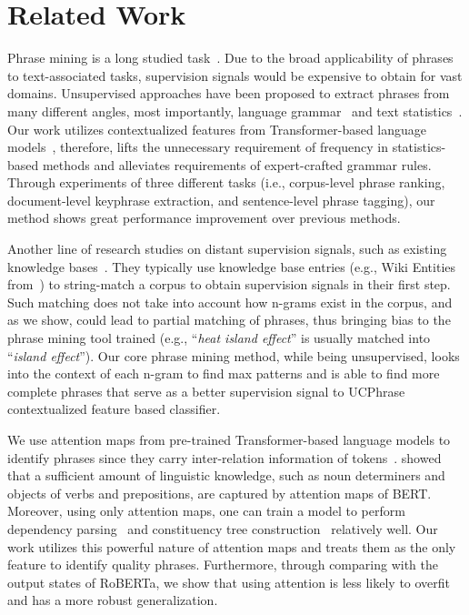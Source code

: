 \documentclass[sigconf]{acmart}
\newcommand{\our}{\mbox{UCPhrase}\xspace}
\newcommand{\eg}{\mbox{e.g.}\xspace}
\newcommand{\example}[1]{``\emph{#1}''}
\begin{document}
  \section{Related Work}
Phrase mining is a long studied task~\cite{frantzi2000automatic,deane2005nonparametric,el2014scalable,liu2015mining,shang2018automated}. 
Due to the broad applicability of phrases to text-associated tasks, supervision signals would be expensive to obtain for vast domains. 
Unsupervised approaches have been proposed to extract phrases from many different angles, most importantly, language grammar~\cite{neubig2011unsupervised, spacy, manning2014stanford} and text statistics~\cite{el2014scalable}. 
Our work utilizes contextualized features from Transformer-based language models~\cite{devlin2019bert, liu2019roberta}, therefore, lifts the unnecessary requirement of frequency in statistics-based methods and alleviates requirements of expert-crafted grammar rules. 
Through experiments of three different tasks (i.e., corpus-level phrase ranking, document-level keyphrase extraction, and sentence-level phrase tagging), our method shows great performance improvement over previous methods. 

Another line of research studies on distant supervision signals, such as existing knowledge bases~\cite{shang2018automated,wang2020mining}. 
They typically use knowledge base entries (\eg, Wiki Entities from~\cite{shang2018automated}) to string-match a corpus to obtain supervision signals in their first step. Such matching does not take into account how n-grams exist in the corpus, and as we show, could lead to partial matching of phrases, thus bringing bias to the phrase mining tool trained (\eg, \example{heat island effect} is usually matched into \example{island effect}). 
Our core phrase mining method, while being unsupervised, looks into the context of each n-gram to find max patterns and is able to find more complete phrases that serve as a better supervision signal to \our contextualized feature based classifier.

We use attention maps from pre-trained Transformer-based language models to identify phrases since they carry inter-relation information of tokens~\cite{clark2019does, kim2019pre}. \citet{clark2019does} showed that a sufficient amount of linguistic knowledge, such as noun determiners and objects of verbs and prepositions, are captured by attention maps of BERT. 
Moreover, using only attention maps, one can train a model to perform dependency parsing~\cite{clark2019does} and constituency tree construction~\cite{kim2019pre} relatively well. 
Our work utilizes this powerful nature of attention maps and treats them as the only feature to identify quality phrases. 
Furthermore, through comparing with the output states of RoBERTa, we show that using attention is less likely to overfit and has a more robust generalization.
\end{document}
